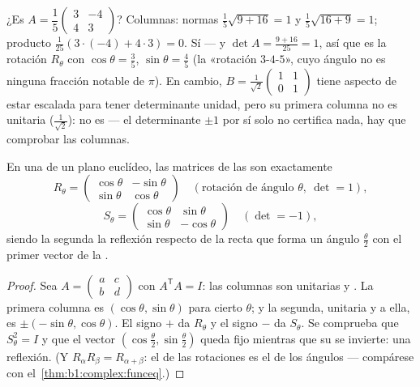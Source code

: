 \begin{example}
\label{ex:b1:euclid:recognize}
¿Es 
$A = \dfrac15\begin{pmatrix} 3 & -4\\ 4 & 3\end{pmatrix}$? Columnas:
normas $\frac15\sqrt{9 + 16} = 1$ y $\frac15\sqrt{16 + 9} = 1$;
producto $\frac1{25}(3\cdot(-4) + 4\cdot3) = 0$. Sí --- y
$\det A = \frac{9 + 16}{25} = 1$, así que es la rotación $R_\theta$
con $\cos\theta = \frac35$, $\sin\theta = \frac45$ (la «rotación
$3$-$4$-$5$», cuyo ángulo no es ninguna fracción notable de $\pi$).
En cambio, $B = \frac{1}{\sqrt2}\begin{pmatrix} 1 & 1\\ 0 &
1\end{pmatrix}$ tiene aspecto de estar escalada para tener determinante
unidad, pero su primera columna no es unitaria ($\frac1{\sqrt2}$): no es 
--- el determinante $\pm1$ por sí solo no certifica nada, hay que
comprobar las columnas.
\end{example}

\begin{theorem}\label{thm:b1:euclid:plane}
En una   de un plano euclídeo, las matrices de las
 son exactamente
\[
R_\theta = \begin{pmatrix}
\cos\theta & -\sin\theta\\ \sin\theta & \cos\theta
\end{pmatrix}
\quad (\text{rotación de ángulo } \theta,\ \det = 1),
\]
\[
S_\theta = \begin{pmatrix}
\cos\theta & \sin\theta\\ \sin\theta & -\cos\theta
\end{pmatrix}
\quad (\det = -1),
\]
siendo la segunda la reflexión respecto de la recta que forma un
ángulo $\frac\theta2$ con el primer vector de la .
\end{theorem}

\begin{proof}
Sea $A = \begin{pmatrix} a & c\\ b & d\end{pmatrix}$ con
$A^{\mathsf T}A = I$: las columnas son unitarias y . La
primera columna es $(\cos\theta, \sin\theta)$ para cierto $\theta$; y
la segunda, unitaria y  a ella, es
$\pm(-\sin\theta, \cos\theta)$. El signo $+$ da $R_\theta$ y el signo
$-$ da $S_\theta$. Se comprueba que $S_\theta^2 = I$ y que el vector
$(\cos\frac\theta2, \sin\frac\theta2)$ queda fijo mientras que su
 se invierte: una reflexión. (Y
$R_\alpha R_\beta = R_{\alpha+\beta}$: el  de las rotaciones es
el  de los ángulos --- compárese con
el~\cref{thm:b1:complex:funceq}.)
\end{proof}

